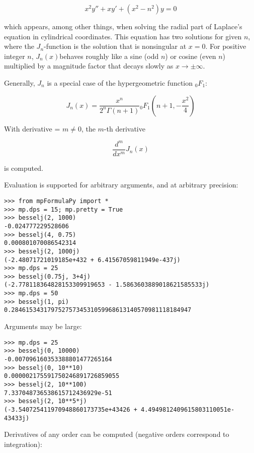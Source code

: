 \begin{equation}
x^2 y'' + xy' + (x^2-n^2)y=0
\end{equation}

which appears, among other things, when solving the radial part of Laplace's equation in cylindrical coordinates. This equation has two solutions for given $n$, where the $J_n$-function is the solution that is nonsingular at $x=0$. For positive integer $n$, $J_n(x)$behaves roughly like a sine (odd $n$) or cosine (even $n$) multiplied by a magnitude factor that decays slowly as $x \rightarrow \pm \infty$.

\vpara
Generally, $J_n$ is a special case of the hypergeometric function ${}_0F_1$:

\begin{equation}
J_n(x)=\frac{x^n}{2^n \Gamma(n+1)}{}_0F_1 \left(n+1, -\frac{x^2}{4}  \right)
\end{equation}

With derivative = $m \neq 0$, the $m$-th derivative

\begin{equation}
\frac{d^m}{dx^m} J_n(x)
\end{equation}

is computed.

Evaluation is supported for arbitrary arguments, and at arbitrary precision:

\begin{lstlisting}
>>> from mpFormulaPy import *
>>> mp.dps = 15; mp.pretty = True
>>> besselj(2, 1000)
-0.024777229528606
>>> besselj(4, 0.75)
0.000801070086542314
>>> besselj(2, 1000j)
(-2.48071721019185e+432 + 6.41567059811949e-437j)
>>> mp.dps = 25
>>> besselj(0.75j, 3+4j)
(-2.778118364828153309919653 - 1.5863603889018621585533j)
>>> mp.dps = 50
>>> besselj(1, pi)
0.28461534317975275734531059968613140570981118184947
\end{lstlisting}

Arguments may be large:

\begin{lstlisting}
>>> mp.dps = 25
>>> besselj(0, 10000)
-0.007096160353388801477265164
>>> besselj(0, 10**10)
0.000002175591750246891726859055
>>> besselj(2, 10**100)
7.337048736538615712436929e-51
>>> besselj(2, 10**5*j)
(-3.540725411970948860173735e+43426 + 4.4949812409615803110051e-43433j)
\end{lstlisting}

Derivatives of any order can be computed (negative orders correspond to integration):

